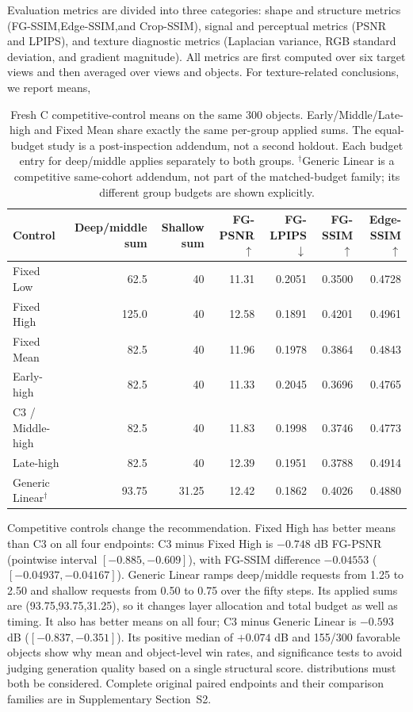 \documentclass[times,twocolumn,final]{elsarticle}
\providecommand{\DIFadd}[1]{{\protect\color{blue} \sf #1}} %
\providecommand{\DIFdel}[1]{{\protect\color{red} \scriptsize #1}} %
\providecommand{\DIFaddbegin}{} %
\providecommand{\DIFaddend}{} %
\providecommand{\DIFdelbegin}{} %
\providecommand{\DIFdelend}{} %
\begin{document}
\DIFdelbegin \DIFdel{Evaluation metrics are divided into three categories: shape and structure metrics (FG-SSIM,Edge-SSIM,and Crop-SSIM), signal and perceptual metrics (PSNR and LPIPS), and texture diagnostic metrics (Laplacian variance, RGB standard deviation, and gradient magnitude). All metrics are first computed over six target views and then averaged over views and objects.
For texture-related conclusions, we report means, }\DIFdelend \DIFaddbegin \begin{table}[t]
\centering\scriptsize\setlength{\tabcolsep}{4pt}
\caption{Fresh C competitive-control means on the same 300 objects. Early/Middle/Late-high and Fixed Mean share exactly the same per-group applied sums. The equal-budget study is a post-inspection addendum, not a second holdout. Each budget entry for deep/middle applies separately to both groups. $^\dagger$Generic Linear is a competitive same-cohort addendum, not part of the matched-budget family; its different group budgets are shown explicitly.}
\label{tab:freshc-absolute}\label{tab:matched-budget300}
\begin{tabular}{lrrrrrr}
\toprule Control & Deep/middle sum & Shallow sum & FG-PSNR$\uparrow$ & FG-LPIPS$\downarrow$ & FG-SSIM$\uparrow$ & Edge-SSIM$\uparrow$ \\
\midrule
Fixed Low & 62.5 & 40 & 11.31 & 0.2051 & 0.3500 & 0.4728 \\
Fixed High & 125.0 & 40 & 12.58 & 0.1891 & 0.4201 & 0.4961 \\
Fixed Mean & 82.5 & 40 & 11.96 & 0.1978 & 0.3864 & 0.4843 \\
Early-high & 82.5 & 40 & 11.33 & 0.2045 & 0.3696 & 0.4765 \\
C3 / Middle-high & 82.5 & 40 & 11.83 & 0.1998 & 0.3746 & 0.4773 \\
Late-high & 82.5 & 40 & 12.39 & 0.1951 & 0.3788 & 0.4914 \\
Generic Linear$^\dagger$ & 93.75 & 31.25 & 12.42 & 0.1862 & 0.4026 & 0.4880 \\

\bottomrule
\end{tabular}
\end{table}

\DIFadd{Competitive controls change the recommendation. Fixed High has better means than C3 on all four endpoints: C3 minus Fixed High is $-0.748$ dB FG-PSNR (pointwise interval $[-0.885,-0.609]$), with FG-SSIM difference $-0.04553$ ($[-0.04937,-0.04167]$). Generic Linear ramps deep/middle requests from 1.25 to 2.50 and shallow requests from 0.50 to 0.75 over the fifty steps. Its applied sums are (93.75,93.75,31.25), so it changes layer allocation and total budget as well as timing. It also has better means on all four; C3 minus Generic Linear is $-0.593$ dB ($[-0.837,-0.351]$). Its positive median of $+0.074$ dB and 155/300 favorable objects show why mean and }\DIFaddend object-level \DIFdelbegin \DIFdel{win rates, and significance tests to avoid judging generation quality based on a single structural score.
}\DIFdelend \DIFaddbegin \DIFadd{distributions must both be considered. Complete original paired endpoints and their comparison families are in Supplementary Section~S2.
}\DIFaddend 
\end{document}
